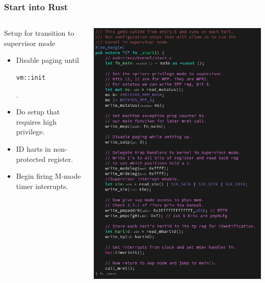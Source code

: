 \documentclass{beamer}
\begin{document}
\begin{frame}[fragile]
  \frametitle{Start into Rust}
  \begin{columns}
    \begin{column}{0.5\textwidth}
      Setup for transition to supervisor mode
      \begin{itemize}
      \item Disable paging until \begin{verbatim}vm::init\end{verbatim}.\\
      \item Do setup that requires high privilege.\\
      \item ID harts in non-protected register.\\
      \item Begin firing M-mode timer interrupts.
      \end{itemize}
    \end{column}
    \begin{column}{0.5\textwidth}
      \includegraphics[width=\textwidth]{start.png}
    \end{column}
  \end{columns}
\end{frame}
\end{document}

